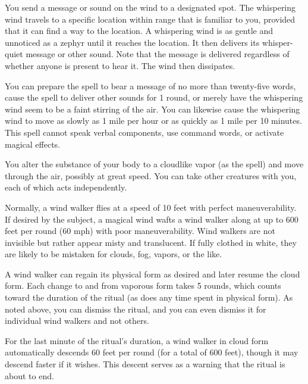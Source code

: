 \spelleffect You send a message or sound on the wind to a designated spot. The whispering wind travels to a specific location within range that is familiar to you, provided that it can find a way to the location. A whispering wind is as gentle and unnoticed as a zephyr until it reaches the location. It then delivers its whisper-quiet message or other sound. Note that the message is delivered regardless of whether anyone is present to hear it. The wind then dissipates.
\par You can prepare the spell to bear a message of no more than twenty-five words, cause the spell to deliver other sounds for 1 round, or merely have the whispering wind seem to be a faint stirring of the air. You can likewise cause the whispering wind to move as slowly as 1 mile per hour or as quickly as 1 mile per 10 minutes.
\spellnotes This spell cannot speak verbal components, use command words, or activate magical effects.

\spelleffect \par You alter the substance of your body to a cloudlike vapor (as the  spell) and move through the air, possibly at great speed. You can take other creatures with you, each of which acts independently.
\par Normally, a wind walker flies at a speed of 10 feet with perfect maneuverability. If desired by the subject, a magical wind wafts a wind walker along at up to 600 feet per round (60 mph) with poor maneuverability. Wind walkers are not invisible but rather appear misty and translucent. If fully clothed in white, they are likely to be mistaken for clouds, fog, vapors, or the like.
\par A wind walker can regain its physical form as desired and later resume the cloud form. Each change to and from vaporous form takes 5 rounds, which counts toward the duration of the ritual (as does any time spent in physical form). As noted above, you can dismiss the ritual, and you can even dismiss it for individual wind walkers and not others.
\par For the last minute of the ritual's duration, a wind walker in cloud form automatically descends 60 feet per round (for a total of 600 feet), though it may descend faster if it wishes. This descent serves as a warning that the ritual is about to end.

